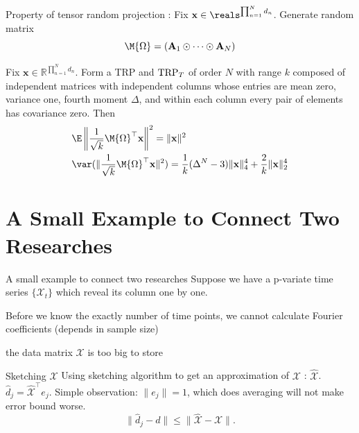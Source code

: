 \documentclass[handout,xcolor={usenames,dvipsnames}]{beamer}
\begin{document}
\begin{frame}{Property of tensor random projection}
:
Fix $\mathbf{x} \in \reals^{\prod_{n=1}^N d_n}$. Generate random matrix 
\[
\M{\Omega}= (\mathbf{A}_1 \odot \cdots \odot \mathbf{A}_N)
\]
\begin{thm}
	Fix $\mathbf{x} \in \mathbb{R}^{\prod_{n=1}^N d_n}$.
	Form a TRP and $\textup{TRP}_T$ of order $N$ with range $k$
	composed of independent matrices with independent columns
	whose entries are mean zero, variance one, fourth moment $\Delta$, and within each column every pair of elements has covariance zero.
	Then
\begin{equation}
\begin{aligned}
& \E \left\| \frac{1}{\sqrt{k}}\M{\Omega}^\top \mathbf{x} \right\|^2 = \|\mathbf{x}\|^2  \\
& \var(\|\frac{1}{\sqrt{k}}\M{\Omega}^\top \mathbf{x}\|^2) = \frac{1}{k}(\Delta^N-3)\|\mathbf{x}\|_4^4 + \frac{2}{k}\|\mathbf{x}\|_2^4 
\end{aligned}
\end{equation}
\end{thm}
\end{frame}



\section{A Small Example to Connect Two Researches}


\begin{frame}{A small example to connect two researches}
Suppose we have a p-variate time series $\{\mathcal{X}_t\}$ which reveal its column one by one. 

\bit 
\item Before we know the exactly number of time points, we cannot calculate Fourier coefficients (depends in sample size)
\item the data matrix $\mathcal{X}$ is too big to store 
\eit
\end{frame}


\begin{frame}{Sketching $\mathcal{X}$}
Using sketching algorithm  to get an approximation of $\mathcal{X}$ : $\hat{\mathcal{X}}$. 
$\hat{d}_j = \hat{\mathcal{X}}^\top e_j$.  Simple observation: $\|e_j\| = 1$, which does averaging will not make error bound worse. 
\[
\|\hat{d}_j - d\| \le \|\hat{\mathcal{X}} - \mathcal{X}\|. 
\]
\end{frame}







\end{document}
